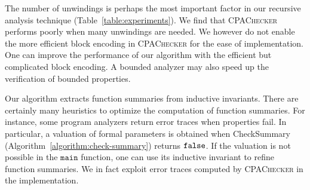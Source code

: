 
The number of unwindings is perhaps the most important factor in our
recursive analysis technique (Table~\ref{table:experiments}). We find
that \textsc{CPAChecker} performs poorly when many unwindings are
needed. We however do not enable the more efficient block encoding in
\textsc{CPAChecker} for the ease of implementation. One can improve
the performance of our algorithm with the efficient but complicated
block encoding. A bounded analyzer may also speed up the
verification of bounded properties. 

Our algorithm extracts function summaries from inductive invariants. 
There are certainly many heuristics to optimize the computation of
function summaries. For instance, some program analyzers return error
traces when properties fail. In particular, a valuation of formal
parameters is obtained when \textmd{CheckSummary}
(Algorithm~\ref{algorithm:check-summary}) returns $\mathtt{false}$. If the
valuation is not possible in the $\mathtt{main}$ function, one can use
its inductive invariant to refine function summaries. We in 
fact exploit error traces computed by \textsc{CPAChecker} in the
implementation. 
